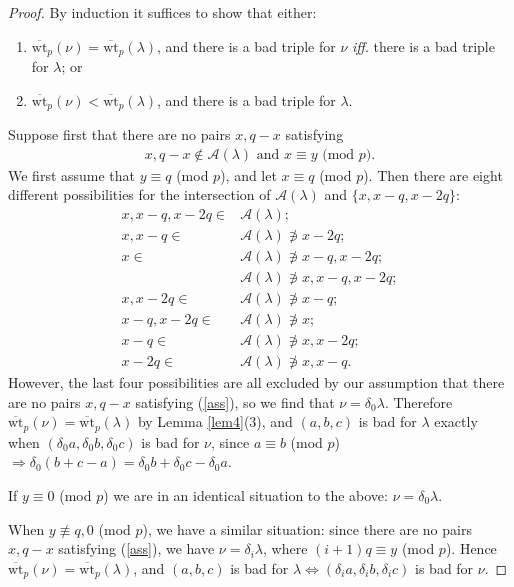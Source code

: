 \documentclass[ALCO, Unicode,published]{cedram}
\begin{document}
\begin{proof}
By induction it suffices to show that either:
\begin{enumerate}
\item  $\overline{\text{wt}}_p(\nu)=\overline{\text{wt}}_p(\lambda)$, and there is a bad triple for $\nu$ \textit{iff}. there is a bad triple for $\lambda$; or 
\item 
$\overline{\text{wt}}_p(\nu)<\overline{\text{wt}}_p(\lambda)$, and there is a bad triple for $\lambda$.
\end{enumerate}
Suppose first that there are no pairs $x,q-x$ satisfying 
\begin{align}\label{ass}x,q-x\not\in\mathcal{A}(\lambda)\text{ and }x\equiv y\text{ (mod }p\text{)}.\end{align} 
We first assume that $y\equiv q$ (mod $p$), and let $x\equiv q$ (mod $p$). Then there are eight different possibilities for the intersection of $\mathcal{A}(\lambda)$ and $\{x,x-q,x-2q\}$: 
\begin{align*}x,x-q,x-2q\in&\mathcal{A}(\lambda);\\
x,x-q\in&\mathcal{A}(\lambda)\not\ni x-2q;\\
x\in&\mathcal{A}(\lambda)\not\ni x-q,x-2q;\\
&\mathcal{A}(\lambda)\not\ni x,x-q,x-2q;\\
x,x-2q\in&\mathcal{A}(\lambda)\not\ni x-q;\\
x-q,x-2q\in&\mathcal{A}(\lambda)\not\ni x;\\
x-q\in&\mathcal{A}(\lambda)\not\ni x,x-2q;\\
x-2q\in&\mathcal{A}(\lambda)\not\ni x,x-q.\end{align*} 
However, the last four possibilities are all excluded by our assumption that there are no pairs $x,q-x$ satisfying (\ref{ass}), so we find that $\nu=\delta_0\lambda$. Therefore $\overline{\text{wt}}_p(\nu)=\overline{\text{wt}}_p(\lambda)$ by Lemma \ref{lem4}(3), and $(a,b,c)$ is bad for $\lambda$ exactly when $(\delta_0a,\delta_0b,\delta_0c)$ is bad for $\nu$, since $a\equiv b$ (mod $p$) $\Rightarrow \delta_0(b+c-a)=\delta_0b+\delta_0c-\delta_0a$.

If $y\equiv 0$ (mod $p$) we are in an identical situation to the above: $\nu=\delta_0\lambda$. 

When $y\not\equiv q,0$ (mod $p$), we have a similar situation: since there are no pairs $x,q-x$ satisfying (\ref{ass}), we have $\nu=\delta_i\lambda$, where $(i+1)q\equiv y$ (mod $p$). Hence $\overline{\text{wt}}_p(\nu)=\overline{\text{wt}}_p(\lambda)$, and $(a,b,c)$ is bad for $\lambda\Leftrightarrow (\delta_ia,\delta_ib,\delta_ic)$ is bad for $\nu$.


\end{proof}
\end{document}
